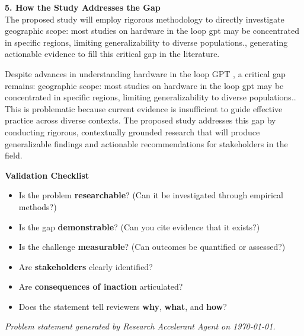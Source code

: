 \documentclass[11pt,a4paper]{article}
\begin{document}
\textbf{5. How the Study Addresses the Gap}\\
The proposed study will employ rigorous methodology to directly investigate geographic scope: most studies on hardware in the loop gpt  may be concentrated in specific regions, limiting generalizability to diverse populations., generating actionable evidence to fill this critical gap in the literature.

\vspace{1em}

\begin{resultbox}
Despite advances in understanding hardware in the loop GPT , a critical gap remains: geographic scope: most studies on hardware in the loop gpt  may be concentrated in specific regions, limiting generalizability to diverse populations.. This is problematic because current evidence is insufficient to guide effective practice across diverse contexts. The proposed study addresses this gap by conducting rigorous, contextually grounded research that will produce generalizable findings and actionable recommendations for stakeholders in the field.
\end{resultbox}

\vspace{1em}

\textbf{\large Validation Checklist}\par\vspace{0.3em}

\begin{itemize}[leftmargin=*, label=$\square$]
    \item Is the problem \textbf{researchable}? (Can it be investigated through empirical methods?)
    \item Is the gap \textbf{demonstrable}? (Can you cite evidence that it exists?)
    \item Is the challenge \textbf{measurable}? (Can outcomes be quantified or assessed?)
    \item Are \textbf{stakeholders} clearly identified?
    \item Are \textbf{consequences of inaction} articulated?
    \item Does the statement tell reviewers \textbf{why}, \textbf{what}, and \textbf{how}?
\end{itemize}

\vfill
\begin{center}
\textit{Problem statement generated by Research Accelerant Agent on \today.}
\end{center}
\end{document}
